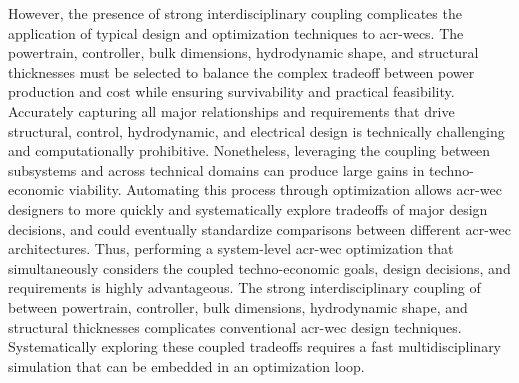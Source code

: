 \ifdefined\DISSERTATION
    However, the presence of strong interdisciplinary coupling complicates the application of typical design and optimization techniques to \glspl{acr-wec}.
    The powertrain, controller, bulk dimensions, hydrodynamic shape, and structural thicknesses must be selected to balance the complex tradeoff between power production and cost while ensuring survivability and practical feasibility.
    Accurately capturing all major relationships and requirements that drive structural, control, hydrodynamic, and electrical design is technically challenging and computationally prohibitive.
    Nonetheless, leveraging the coupling between subsystems and across technical domains can produce large gains in techno-economic viability.
    Automating this process through optimization allows \gls{acr-wec} designers to more quickly and systematically explore tradeoffs of major design decisions, and could eventually standardize comparisons between different \gls{acr-wec} architectures.
    Thus, performing a system-level \gls{acr-wec} optimization that simultaneously considers the coupled techno-economic goals, design decisions, and requirements is highly advantageous.
\else
    The strong interdisciplinary coupling of between powertrain, controller, bulk dimensions, hydrodynamic shape, and structural thicknesses complicates conventional \gls{acr-wec} design techniques.
    Systematically exploring these coupled tradeoffs requires a fast multidisciplinary simulation that can be embedded in an optimization loop.
\fi

